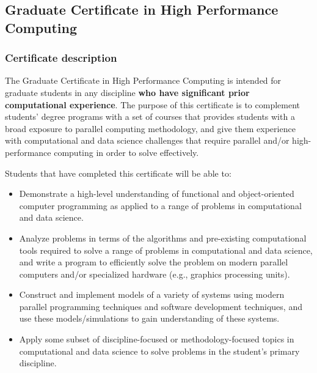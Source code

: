 \subsection{Graduate Certificate in High Performance Computing}
\label{sec:cert_hpc}

\subsubsection{Certificate description}

The Graduate Certificate in High Performance Computing is intended for
graduate students in any discipline \textbf{who have significant prior
computational experience}.  The purpose of this certificate is to
complement students' degree programs with a set of courses that
provides students with a broad exposure to parallel computing
methodology, and give them experience with computational and data
science challenges that require parallel and/or high-performance
computing in order to solve effectively.

\vspace{2mm}

\noindent
Students that have completed this certificate will be able to:

\begin{itemize}
\item  Demonstrate a high-level understanding of functional and
  object-oriented computer programming as applied to a range of
  problems in computational and data science.

\item  Analyze problems in terms of the algorithms and pre-existing
  computational tools required to solve a range of problems in
  computational and data science, and write a program to efficiently
  solve the problem on modern parallel computers and/or specialized
  hardware (e.g., graphics processing units).

\item  Construct and implement models of a variety of systems using
  modern parallel programming techniques and software development
  techniques, and use these models/simulations to gain understanding
  of these systems.

\item  Apply some subset of discipline-focused or methodology-focused
topics in computational and data science to solve problems in the
student's primary discipline.

\end{itemize}

